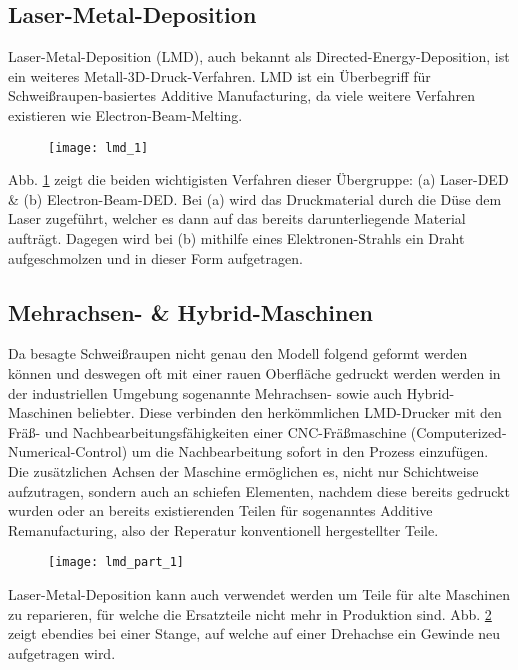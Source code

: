 \documentclass[main.tex]{subfiles}
\begin{document}
\subsection{Laser-Metal-Deposition}
Laser-Metal-Deposition (LMD), auch bekannt als Directed-Energy-Deposition, ist ein weiteres Metall-3D-Druck-Verfahren. LMD ist ein Überbegriff für Schweißraupen-basiertes Additive Manufacturing, da viele weitere Verfahren existieren wie Electron-Beam-Melting.
\begin{figure}[h!]
	\begin{center}

		\texttt{[image: lmd\_1]}
\label{img:lmd_1}	
	\end{center}
\end{figure}
Abb. \ref{img:lmd_1} zeigt die beiden wichtigisten Verfahren dieser Übergruppe: (a) Laser-DED \& (b) Electron-Beam-DED.
Bei (a) wird das Druckmaterial durch die Düse dem Laser zugeführt, welcher es dann auf das bereits darunterliegende Material aufträgt. 
Dagegen wird bei (b) mithilfe eines Elektronen-Strahls ein Draht aufgeschmolzen und in dieser Form aufgetragen. \parencite{ALL3D_1}
\subsection{Mehrachsen- \& Hybrid-Maschinen}

Da besagte Schweißraupen nicht genau den Modell folgend geformt werden können und deswegen oft mit einer rauen Oberfläche gedruckt werden werden in der industriellen Umgebung sogenannte Mehrachsen- sowie auch Hybrid-Maschinen beliebter. Diese verbinden den herkömmlichen LMD-Drucker mit den Fräß- und Nachbearbeitungsfähigkeiten einer CNC-Fräßmaschine (Computerized-Numerical-Control) um die Nachbearbeitung sofort in den Prozess einzufügen.
Die zusätzlichen Achsen der Maschine ermöglichen es, nicht nur Schichtweise aufzutragen, sondern auch an schiefen Elementen, nachdem diese bereits gedruckt wurden oder an bereits existierenden Teilen für sogenanntes Additive Remanufacturing, also der Reperatur konventionell hergestellter Teile. \parencite{ALL3D_2}
\begin{figure}[h!]
	\begin{center}
	\texttt{[image: lmd\_part\_1]}	
		\label{img:lmd_part_1}
	\end{center}
	
\end{figure}

Laser-Metal-Deposition kann auch verwendet werden um Teile für alte Maschinen zu reparieren, für welche die Ersatzteile nicht mehr in Produktion sind.
Abb. \ref{img:lmd_part_1} zeigt ebendies bei einer Stange, auf welche auf einer Drehachse ein Gewinde neu aufgetragen wird. 
\end{document}
